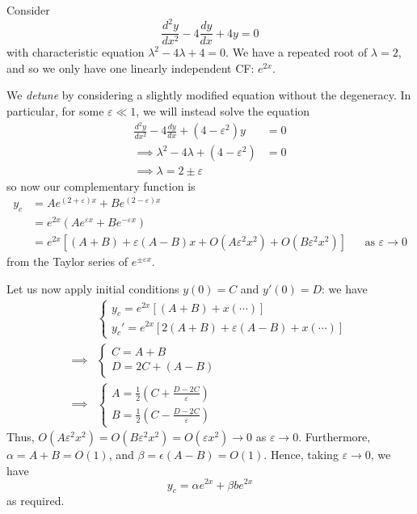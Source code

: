 \documentclass{../template/note}
\begin{document}
    \begin{example}
        Consider
        \[
            \frac{d^2y}{dx^2} - 4 \frac{dy}{dx} + 4y = 0
        \]
        with characteristic equation \(\lambda^2 - 4 \lambda + 4 = 0\). We have a repeated root of \(\lambda = 2\), and so we only have one linearly independent CF: \(e^{2x}\).

        We \emph{detune} by considering a slightly modified equation without the degeneracy. In particular, for some \(\varepsilon \ll 1\), we will instead solve the equation
        \begin{align*}
            \frac{d^2y}{dx^2} - 4 \frac{dy}{dx} + (4-\varepsilon^2)y &= 0 \\
            \implies \lambda^2 - 4\lambda + (4-\varepsilon^2) &= 0 \\
            \implies \lambda = 2 \pm \varepsilon
        \end{align*}
        so now our complementary function is
        \begin{align*}
            y_c &= Ae^{(2+\varepsilon)x} + Be^{(2-\varepsilon)x} \\
            &= e^{2x}(Ae^{\varepsilon x}+Be^{-\varepsilon x}) \\
            &= e^{2x}\left[(A+B) + \varepsilon(A-B)x + O(A\varepsilon^2 x^2) + O(B \varepsilon^2 x^2)\right] && \text{as } \varepsilon \to 0
        \end{align*}
        from the Taylor series of \(e^{\pm \varepsilon x}\).
        
        Let us now apply initial conditions \(y(0) = C\) and \(y'(0) = D\): we have
        \begin{align*}
            &\begin{cases}
                y_c = e^{2x}[(A + B) + x(\cdots)] \\
                y_c' = e^{2x}[2(A + B) + \varepsilon(A-B) + x(\cdots)]
            \end{cases} \\
            \implies &\begin{cases}
                C = A + B \\
                D = 2C + (A - B)
            \end{cases} \\
            \implies &\begin{cases}
                A = \frac{1}{2}\left(C + \frac{D-2C}{\varepsilon}\right) \\
                B = \frac{1}{2}\left(C - \frac{D-2C}{\varepsilon}\right)
            \end{cases}
        \end{align*}
        Thus, \(O(A \varepsilon^2 x^2) = O(B \varepsilon^2 x^2) = O(\varepsilon x^2) \to 0\) as \(\varepsilon \to 0\). Furthermore, \(\alpha = A + B = O(1)\), and \(\beta = \epsilon(A-B) = O(1)\). Hence, taking \(\varepsilon \to 0\), we have
        \[
            y_c = \alpha e^{2x} + \beta be^{2x}
        \]
        as required.
    \end{example}
    
\end{document}
